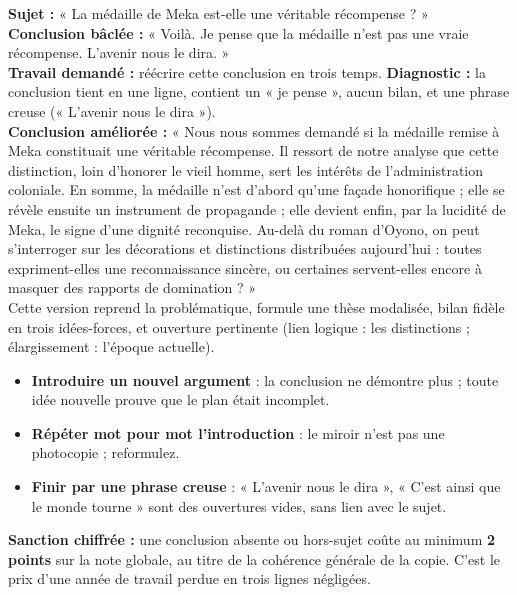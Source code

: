 \documentclass[11pt]{article}
\begin{document}
\begin{exoresolu}
\textbf{Sujet :} « La médaille de Meka est-elle une véritable récompense ? »\\
\textbf{Conclusion bâclée :} « Voilà. Je pense que la médaille n'est pas une vraie récompense. L'avenir nous le dira. »\\
\textbf{Travail demandé :} réécrire cette conclusion en trois temps.
\tcblower
\textbf{Diagnostic :} la conclusion tient en une ligne, contient un « je pense », aucun bilan, et une phrase creuse (« L'avenir nous le dira »).\\
\textbf{Conclusion améliorée :} « Nous nous sommes demandé si la médaille remise à Meka constituait une véritable récompense. Il ressort de notre analyse que cette distinction, loin d'honorer le vieil homme, sert les intérêts de l'administration coloniale. En somme, la médaille n'est d'abord qu'une façade honorifique ; elle se révèle ensuite un instrument de propagande ; elle devient enfin, par la lucidité de Meka, le signe d'une dignité reconquise. Au-delà du roman d'Oyono, on peut s'interroger sur les décorations et distinctions distribuées aujourd'hui : toutes expriment-elles une reconnaissance sincère, ou certaines servent-elles encore à masquer des rapports de domination ? »\\
Cette version reprend la problématique, formule une thèse modalisée, bilan fidèle en trois idées-forces, et ouverture pertinente (lien logique : les distinctions ; élargissement : l'époque actuelle).
\end{exoresolu}

\begin{attention}
\begin{itemize}
\item \textbf{Introduire un nouvel argument} : la conclusion ne démontre plus ; toute idée nouvelle prouve que le plan était incomplet.
\item \textbf{Répéter mot pour mot l'introduction} : le miroir n'est pas une photocopie ; reformulez.
\item \textbf{Finir par une phrase creuse} : « L'avenir nous le dira », « C'est ainsi que le monde tourne » sont des ouvertures vides, sans lien avec le sujet.
\end{itemize}
\textbf{Sanction chiffrée :} une conclusion absente ou hors-sujet coûte au minimum \textbf{2 points} sur la note globale, au titre de la cohérence générale de la copie. C'est le prix d'une année de travail perdue en trois lignes négligées.
\end{attention}
\end{document}
